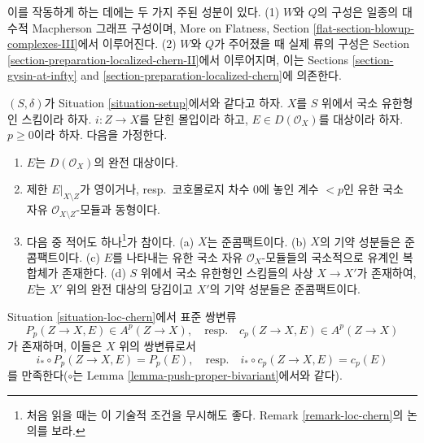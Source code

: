 \medskip\noindent
이를 작동하게 하는 데에는 두 가지 주된 성분이 있다. (1) $W$와 $Q$의
구성은 일종의 대수적 Macpherson 그래프 구성이며, More on Flatness,
Section \ref{flat-section-blowup-complexes-III}에서 이루어진다. (2) $W$와
$Q$가 주어졌을 때 실제 류의 구성은 Section
\ref{section-preparation-localized-chern-II}에서 이루어지며, 이는 Sections
\ref{section-gysin-at-infty} and
\ref{section-preparation-localized-chern}에 의존한다.

\begin{situation}
\label{situation-loc-chern}
$(S, \delta)$가 Situation \ref{situation-setup}에서와 같다고 하자.
$X$를 $S$ 위에서 국소 유한형인 스킴이라 하자. $i : Z \to X$를 닫힌
몰입이라 하고, $E \in D(\mathcal{O}_X)$를 대상이라 하자.
$p \geq 0$이라 하자. 다음을 가정한다.
\begin{enumerate}
\item $E$는 $D(\mathcal{O}_X)$의 완전 대상이다.
\item 제한 $E|_{X \setminus Z}$가 영이거나, resp.\ 코호몰로지 차수
$0$에 놓인 계수 $< p$인 유한 국소 자유
$\mathcal{O}_{X \setminus Z}$-모듈과 동형이다.
\item 다음 중 적어도 하나\footnote{처음 읽을 때는 이 기술적 조건을
무시해도 좋다. Remark \ref{remark-loc-chern}의 논의를 보라.}가
참이다.
(a) $X$는 준콤팩트이다.
(b) $X$의 기약 성분들은 준콤팩트이다.
(c) $E$를 나타내는 유한 국소 자유 $\mathcal{O}_X$-모듈들의 국소적으로
유계인 복합체가 존재한다.
(d) $S$ 위에서 국소 유한형인 스킴들의 사상 $X \to X'$가 존재하여,
$E$는 $X'$ 위의 완전 대상의 당김이고 $X'$의 기약 성분들은
준콤팩트이다.
\end{enumerate}
\end{situation}

\begin{lemma}
\label{lemma-independent-loc-chern}
Situation \ref{situation-loc-chern}에서 표준 쌍변류
$$
P_p(Z \to X, E) \in A^p(Z \to X),
\quad\text{resp.}\quad
c_p(Z \to X, E) \in A^p(Z \to X)
$$
가 존재하며, 이들은 $X$ 위의 쌍변류로서
\begin{equation}
\label{equation-defining-property-localized-classes}
i_* \circ P_p(Z \to X, E) = P_p(E),
\quad\text{resp.}\quad
i_* \circ c_p(Z \to X, E) = c_p(E)
\end{equation}
를 만족한다($\circ$는 Lemma \ref{lemma-push-proper-bivariant}에서와 같다).
\end{lemma}

